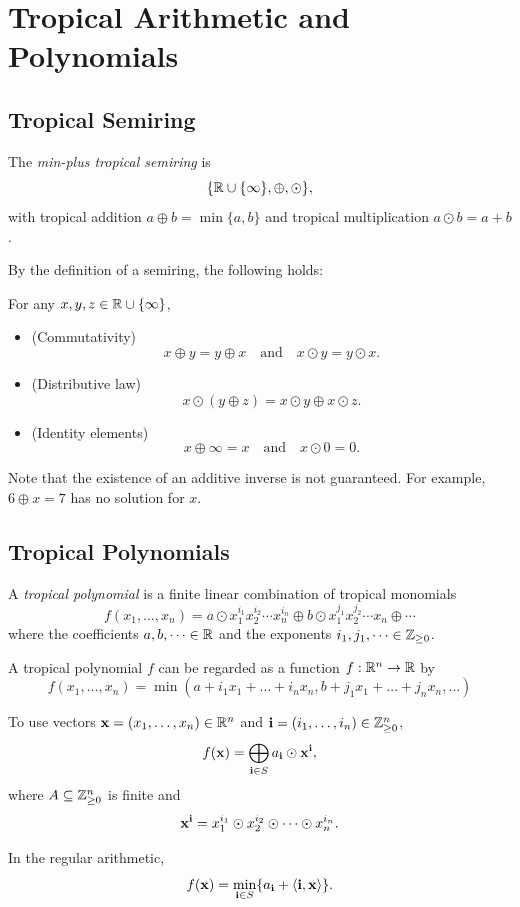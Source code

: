 \documentclass[../../main.tex]{subfiles}
\begin{document}
\section{Tropical Arithmetic and Polynomials}

\subsection{Tropical Semiring}

\begin{defin}
    The \textit{min-plus tropical semiring} is
    \[\{\mathbb{R} \cup \{\infty\},\oplus,\odot\},\]
    with tropical addition $a \oplus b = \min\{a,b\}$ and 
    tropical multiplication $a \odot b = a+b$.
\end{defin}

By the definition of a semiring, the following holds: 
\begin{prop}
    For any $x,y,z \in \mathbb{R}\cup \{\infty\}$,
    \begin{itemize}
        \item (Commutativity)
        \[x\oplus y=y\oplus x \quad \text{and}\quad x\odot y=y\odot x.\]
        \item (Distributive law)
        \[x\odot(y\oplus z)=x\odot y\oplus x\odot z.\]
        \item (Identity elements)
        \[x\oplus \infty=x\quad \text{and}\quad x\odot 0=0.\]
    \end{itemize}

    Note that the existence of an additive inverse is not guaranteed. For example, $6\oplus x=7$ has no solution for $x$.
\end{prop}

\subsection{Tropical Polynomials}

\begin{defin}
    A \textit{tropical polynomial} is a finite linear combination of tropical monomials 
    \[f(x_1,\dots,x_n)=a\odot x_1^{i_1}x_2^{i_2}\cdots x_n^{i_n}\oplus b\odot x_1^{j_1}x_2^{j_2}\cdots x_n\oplus \cdots\]
    where the coefficients $a,b,\dots \in \mathbb{R}$ and the exponents $i_1,j_1,\dots \in \mathbb{Z}_{\ge 0}$. 

    A tropical polynomial $f$ can be regarded as a function $f:\mathbb{R}^n \to \mathbb{R}$ by
    \[f(x_1,\dots,x_n)=\min(a+i_1x_1+\dots+i_nx_n,b+j_1x_1+\dots+j_nx_n,\dots)\]

    To use vectors $\mathbf{x}=(x_1,\dots,x_n) \in \mathbb{R}^n$ and $\mathbf{i}=(i_1,\dots,i_n)\in \mathbb{Z}_{\ge 0}^n$,
    \[f(\mathbf{x})=\bigoplus_{\mathbf{i} \in S}a_{\mathbf{i}} \odot \mathbf{x}^{\mathbf{i}},\]
    where $A\subseteq \mathbb{Z}_{\ge 0}^n$ is finite and 
    \[\mathbf{x}^{\mathbf{i}}=x_1^{i_1}\odot x_2^{i_2}\odot \cdots \odot x_n^{i_n}.\]

    In the regular arithmetic,
    \[f(\mathbf{x})=\min_{\mathbf{i} \in S}\{a_{\mathbf{i}}+\langle \mathbf{i},\mathbf{x}\rangle\}.\]
\end{defin}
\end{document}
